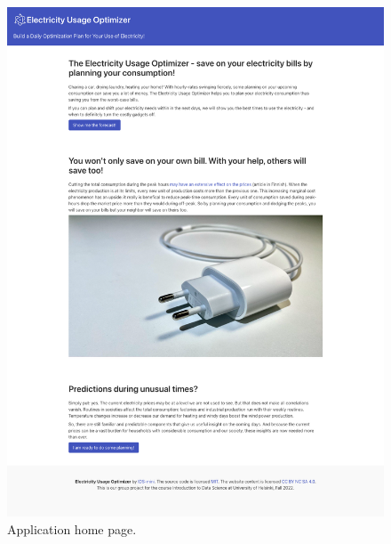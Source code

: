 \begin{figure}[H]
    \centering
    \includegraphics[height=0.9\textheight]{report/images/application-home-page.png}
    \caption{Application home page.}
    \label{fig:app-home-page}
\end{figure}


